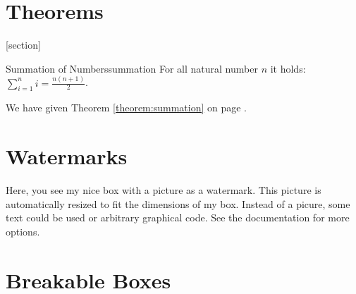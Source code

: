 \documentclass{article}
\begin{document}
\section{Theorems}

[section]
\def\themytheorem{\thesection.\arabic{mytheorem}}


\begin{theo}{Summation of Numbers}{summation}
  For all natural number $n$ it holds:\\[2mm]
  $\displaystyle\sum\limits_{i=1}^n i = \frac{n(n+1)}{2}$.
\end{theo}

We have given Theorem \ref{theorem:summation} on page \pageref{theorem:summation}.


\section{Watermarks}

\begin{tcolorbox}[enhanced,watermark graphics=Basilica_5.png,
  watermark opacity=0.3,watermark zoom=0.9,
  colback=green!5!white,colframe=green!75!black,
  fonttitle=\bfseries, title=Box with a watermark picture]
  Here, you see my nice box with a picture as a watermark.
  This picture is automatically resized to fit the dimensions
  of my box. Instead of a picure, some text could be used or
  arbitrary graphical code. See the documentation for more options.
\end{tcolorbox}

\section{Breakable Boxes}

\begin{tcolorbox}[enhanced,breakable,
  colback=blue!5!white,colframe=blue!75!black,title=Breakable box,
  watermark color=white,watermark text=\Roman{tcbbreakpart}]
  \lipsum[1-18]
\end{tcolorbox}
\end{document}
